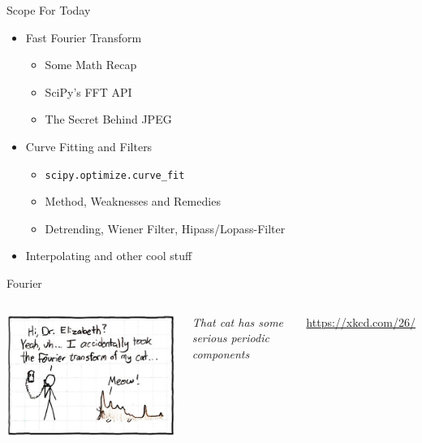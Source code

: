 
\begin{frame}[t,plain]
\titlepage
\end{frame}


\begin{frame}{Scope For Today}
%
\begin{itemize}
\item Fast Fourier Transform
	\begin{itemize}
	\item Some Math Recap
	\item SciPy's FFT API
	\item The Secret Behind JPEG
	\end{itemize}
\item Curve Fitting and Filters
	\begin{itemize}
	\item \texttt{scipy.optimize.curve\_fit}
	\item Method, Weaknesses and Remedies
	\item Detrending, Wiener Filter, Hipass/Lopass-Filter
	\end{itemize}
\item Interpolating and other cool stuff
\end{itemize}
%
\end{frame}


\begin{frame}{Fourier}
%
\begin{columns}
\begin{center}
\includegraphics[width=\linewidth]{./gfx/05-xkcd-fourier}\\
\end{center}
%
\small
	\emph{That cat has some serious periodic components}

	\vspace{6pt}
	\url{https://xkcd.com/26/}
\end{columns}
%
\end{frame}


